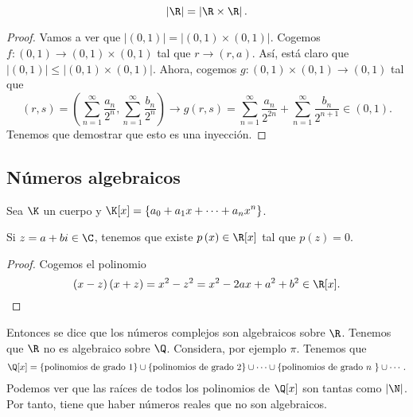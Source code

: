 \begin{ftheorem}[]
\normalfont 
\[ \left|\R\right| = \left|\R \times \R\right| .\]
\end{ftheorem}
\begin{proof}
Vamos a ver que $\displaystyle \left|\left(0,1\right)\right| = \left|\left(0,1\right) \times \left(0,1\right)\right| $. Cogemos $\displaystyle f : \left(0,1\right) \to \left(0,1\right) \times \left(0,1\right) $ tal que $\displaystyle r \to \left(r,a\right) $. Así, está claro que $\displaystyle \left|\left(0,1\right)\right| \leq \left|\left(0,1\right) \times \left(0,1\right)\right| $. Ahora, cogemos $\displaystyle g : \left(0,1\right) \times \left(0,1\right) \to \left(0,1\right) $ tal que 
\[\left(r,s\right) = \left(\sum^{\infty}_{n = 1}\frac{a_{n}}{2^{n}}, \sum^{\infty}_{n = 1}\frac{b_{n}}{2^{n}}\right) \to g\left(r,s\right) = \sum^{\infty}_{n = 1}\frac{a_{n}}{2^{2n}} + \sum^{\infty}_{n = 1}\frac{b_{n}}{2^{n+1}} \in \left(0,1\right) .\]
Tenemos que demostrar que esto es una inyección.
\end{proof}
\subsection{Números algebraicos}
Sea $\displaystyle \K $ un cuerpo y $\displaystyle \K[x] = \left\{ a_{0} + a_{1}x + \cdots + a_{n}x^{n}\right\}  $.
\begin{fprop}[]
	\normalfont Si $\displaystyle z = a + bi \in \C $, tenemos que existe $\displaystyle p\left(x\right) \in \R[x] $ tal que $\displaystyle p\left(z\right) = 0 $.
\end{fprop}
\begin{proof}
Cogemos el polinomio
\[
	\left(x - z\right)\left(x + z\right) = x^{2}-z^{2} = x^{2} - 2ax + a^{2} + b^{2} \in \R[x] .
\]
\end{proof}
Entonces se dice que los números complejos son algebraicos sobre $\displaystyle \R $. Tenemos que $\displaystyle \R $ no es algebraico sobre $\displaystyle \Q $. Considera, por ejemplo $\displaystyle \pi  $.
Tenemos que
\[
\begin{split}
	\Q[x] = \left\{ \text{polinomios de grado 1}\right\} \cup \left\{ \text{polinomios de grado 2}\right\} \cup \cdots \cup \left\{ \text{polinomios de grado $\displaystyle n $ }\right\} \cup \cdots  .
\end{split}
\]
Podemos ver que las raíces de todos los polinomios de $\displaystyle \Q[x] $ son tantas como $\displaystyle \left|\N\right| $. Por tanto, tiene que haber números reales que no son algebraicos.

